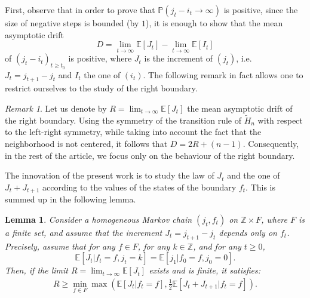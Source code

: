 \documentclass[11pt]{article}
\theoremstyle{plain}
\newtheorem{lemma}[theorem]{Lemma}
\theoremstyle{definition}
\theoremstyle{remark}
\newtheorem{remark}{Remark}
\newcommand{\ZZ}{\mathbb{Z}}
\newcommand{\prob}[1]{\mathbb{P}\left( #1 \right)}
\newcommand{\esp}[1]{\mathbb{E}\left[ #1 \right]}
\newcommand{\env}[1]{\tilde{H}_{#1}}
\begin{document}
First, observe that in order to prove that $\prob{j_t-i_t\to\infty}$ is positive, since the size of negative steps is bounded (by $1$), it is enough to show that the mean asymptotic drift
\begin{displaymath}
  D = \lim_{t\to\infty} \esp{J_t} - \lim_{t\to\infty}\esp{I_t}
\end{displaymath}
of $(j_t-i_t)_{t\geq t_0}$ is positive, where $J_t$ is the increment of $(j_{t})$, i.e.\ $J_t = j_{t+1}-j_t$ and $I_t$ the one of $(i_{t})$. The following remark in fact allows one to restrict ourselves to the study of the right boundary.

\begin{remark}\label{rem:symm}
Let us denote by $R =\lim_{t\to\infty}\esp{J_t}$ the mean asymptotic drift of the right boundary. Using the symmetry of the transition rule of $\env{n}$ with respect to the left-right symmetry, while taking into account the fact that the neighborhood is not centered, it follows that $D=2R+(n-1)$. Consequently, in the rest of the article, we focus only on the behaviour of the right boundary.
\end{remark}

The innovation of the present work is to study the law of $J_t$ and the one of $J_{t}+J_{t+1}$ according to the values of the states of the boundary $f_t$. This is summed up in the following lemma.

\begin{lemma}\label{LemMinMax}
Consider a homogeneous Markov chain $(j_t,f_t)$ on $\ZZ \times F$, where $F$ is a finite set, and assume that the increment $J_t = j_{t+1}-j_t$ depends only on $f_t$. Precisely, assume that for any $f \in F$, for any $k\in\ZZ$, and for any $t\geq 0$, $$\esp{J_t| f_t =f, j_t=k } = \esp{j_1|f_0=f,j_0=0}.$$ Then, if the limit $R = \lim_{t \to \infty} \esp{J_t}$ exists and is finite, it satisfies:
  \begin{align}\label{eq:rightminmax}
    R \geq \min_{f \in F} \max \left( \esp{J_t | f_t = f},\frac{1}{2} \esp{J_t+J_{t+1} | f_t = f} \right).
  \end{align}
\end{lemma}
\end{document}
